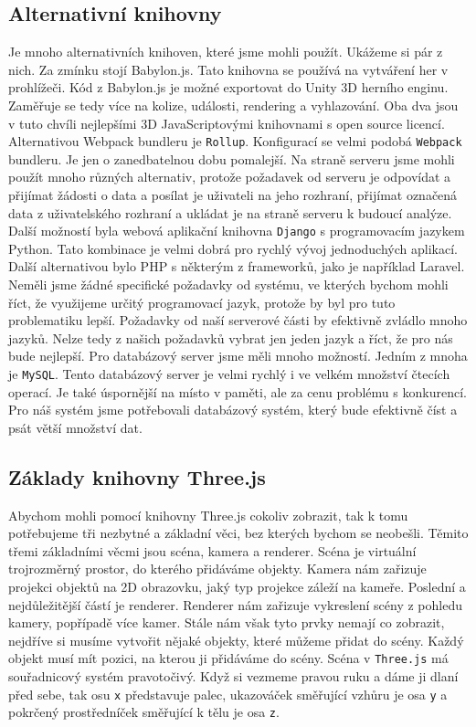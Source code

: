 \documentclass[czech,bachelor,dept420,male,cpdeclaration]{diploma}
\begin{document}
\subsection{Alternativní knihovny} Je mnoho alternativních knihoven, které jsme mohli použít. Ukážeme si pár z nich. Za zmínku stojí Babylon.js. Tato knihovna se používá na vytváření her v prohlížeči. Kód z Babylon.js je možné exportovat do Unity 3D herního enginu. Zaměřuje se tedy více na kolize, události, rendering a vyhlazování. Oba dva jsou v tuto chvíli nejlepšími 3D JavaScriptovými knihovnami s open source licencí. Alternativou Webpack bundleru je \texttt{Rollup}. Konfigurací se velmi podobá \texttt{Webpack} bundleru. Je jen o zanedbatelnou dobu pomalejší. Na straně serveru jsme mohli použít mnoho různých alternativ, protože požadavek od serveru je odpovídat a přijímat žádosti o data a posílat je uživateli na jeho rozhraní, přijímat označená data z uživatelského rozhraní a ukládat je na straně serveru k budoucí analýze. Další možností byla webová aplikační knihovna \texttt{Django} s programovacím jazykem Python. Tato kombinace je velmi dobrá pro rychlý vývoj jednoduchých aplikací. Další alternativou bylo PHP s některým z frameworků, jako je například Laravel. Neměli jsme žádné specifické požadavky od systému, ve kterých bychom mohli říct, že využijeme určitý programovací jazyk, protože by byl pro tuto problematiku lepší. Požadavky od naší serverové části by efektivně zvládlo mnoho jazyků. Nelze tedy z našich požadavků vybrat jen jeden jazyk a říct, že pro nás bude nejlepší. Pro databázový server jsme měli mnoho možností. Jedním z mnoha je \texttt{MySQL}. Tento databázový server je velmi rychlý i ve velkém množství čtecích operací. Je také úspornější na místo v paměti, ale za cenu problému s konkurencí. Pro náš systém jsme potřebovali databázový systém, který bude efektivně číst a psát větší množství dat.


\subsection{Základy knihovny Three.js} Abychom mohli pomocí knihovny Three.js cokoliv zobrazit, tak k tomu potřebujeme tři nezbytné a základní věci, bez kterých bychom se neobešli. Těmito třemi základními věcmi jsou scéna, kamera a renderer. Scéna je virtuální trojrozměrný prostor, do kterého přidáváme objekty. Kamera nám zařizuje projekci objektů na 2D obrazovku, jaký typ projekce záleží na kameře. Poslední a nejdůležitější částí je renderer. Renderer nám zařizuje vykreslení scény z pohledu kamery, popřípadě více kamer. Stále nám však tyto prvky nemají co zobrazit, nejdříve si musíme vytvořit nějaké objekty, které můžeme přidat do scény. Každý objekt musí mít pozici, na kterou ji přidáváme do scény. Scéna v \texttt{Three.js} má souřadnicový systém pravotočivý. Když si vezmeme pravou ruku a dáme ji dlaní před sebe, tak osu \texttt{x} představuje palec, ukazováček směřující vzhůru je osa \texttt{y} a pokrčený  prostředníček směřující k tělu je osa \texttt{z}.
\end{document}
